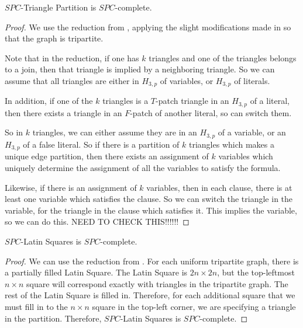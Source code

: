 \documentclass[runningheads,a4paper]{llncs}
\begin{document}
\begin{proposition}
$SPC$-Triangle Partition is $SPC$-complete.
\end{proposition}

\begin{proof}
We use the reduction from \cite{holyer1981np}, applying the slight modifications made in \cite{colbourn1984complexity} so that the graph is tripartite. 

Note that in the reduction, if one has $k$ triangles and one of the triangles belongs to a join, then that triangle is implied by a neighboring triangle. So we can assume that all triangles are either in $H_{3,p}$ of variables, or $H_{3,p}$ of literals. 

In addition, if one of the $k$ triangles is a $T$-patch triangle in an $H_{3,p}$ of a literal, then there exists a triangle in an $F$-patch of another literal, so can switch them.

So in $k$ triangles, we can either assume they are in an $H_{3,p}$ of a variable, or an $H_{3,p}$ of a false literal. So if there is a partition of $k$ triangles which makes a unique edge partition, then there exists an assignment of $k$ variables which uniquely determine the assignment of all the variables to satisfy the formula. 

Likewise, if there is an assignment of $k$ variables, then in each clause, there is at least one variable which satisfies the clause. So we can switch the triangle in the variable, for the triangle in the clause which satisfies it. This implies the variable, so we can do this. NEED TO CHECK THIS!!!!!!
\end{proof}

\begin{corollary}
$SPC$-Latin Squares is $SPC$-complete.
\end{corollary}

\begin{proof}
We can use the reduction from \cite{colbourn1984complexity}. For each uniform tripartite graph, there is a partially filled Latin Square. The Latin Square is $2n \times 2n$, but the top-leftmost $n \times n$ square will correspond exactly with triangles in the tripartite graph. The rest of the Latin Square is filled in. Therefore, for each additional square that we must fill in to the $n \times n$ square in the top-left corner, we are specifying a triangle in the partition. Therefore, $SPC$-Latin Squares is $SPC$-complete.
\end{proof}
\end{document}
